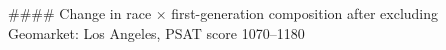 #### Change in race × first-generation composition after excluding Geomarket: Los Angeles, PSAT score 1070–1180

